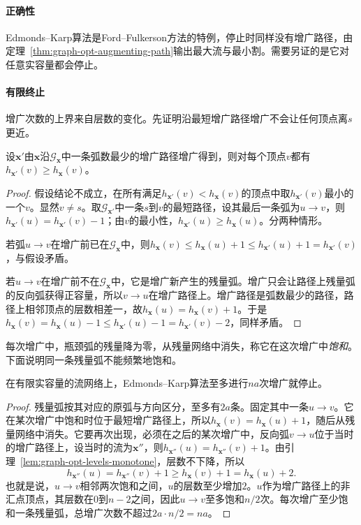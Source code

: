\paragraph{正确性}
Edmonds--Karp算法是Ford--Fulkerson方法的特例，停止时同样没有增广路径，由定理~\ref{thm:graph-opt-augmenting-path}输出最大流与最小割。需要另证的是它对任意实容量都会停止。

\paragraph{有限终止}
增广次数的上界来自层数的变化。先证明沿最短增广路径增广不会让任何顶点离$s$更近。

\begin{lemma}[残量层数单调不减]
\label{lem:graph-opt-levels-monotone}
设$\bm x'$由$\bm x$沿$\mathcal G_{\bm x}$中一条弧数最少的增广路径增广得到，则对每个顶点$v$都有$h_{\bm x'}(v)\geq h_{\bm x}(v)$。
\end{lemma}

\begin{proof}
假设结论不成立，在所有满足$h_{\bm x'}(v)<h_{\bm x}(v)$的顶点中取$h_{\bm x'}(v)$最小的一个$v$。显然$v\neq s$。取$\mathcal G_{\bm x'}$中一条$s$到$v$的最短路径，设其最后一条弧为$u\to v$，则$h_{\bm x'}(u)=h_{\bm x'}(v)-1$；由$v$的最小性，$h_{\bm x'}(u)\geq h_{\bm x}(u)$。分两种情形。

若弧$u\to v$在增广前已在$\mathcal G_{\bm x}$中，则$h_{\bm x}(v)\leq h_{\bm x}(u)+1\leq h_{\bm x'}(u)+1=h_{\bm x'}(v)$，与假设矛盾。

若$u\to v$在增广前不在$\mathcal G_{\bm x}$中，它是增广新产生的残量弧。增广只会让路径上残量弧的反向弧获得正容量，所以$v\to u$在增广路径上。增广路径是弧数最少的路径，路径上相邻顶点的层数相差一，故$h_{\bm x}(u)=h_{\bm x}(v)+1$。于是$h_{\bm x}(v)=h_{\bm x}(u)-1\leq h_{\bm x'}(u)-1=h_{\bm x'}(v)-2$，同样矛盾。
\end{proof}

每次增广中，瓶颈弧的残量降为零，从残量网络中消失，称它在这次增广中\emph{饱和}。下面说明同一条残量弧不能频繁地饱和。

\begin{theorem}
\label{thm:graph-opt-edmonds-karp}
在有限实容量的流网络上，Edmonds--Karp算法至多进行$na$次增广就停止。
\end{theorem}

\begin{proof}
残量弧按其对应的原弧与方向区分，至多有$2a$条。固定其中一条$u\to v$。它在某次增广中饱和时位于最短增广路径上，所以$h_{\bm x}(v)=h_{\bm x}(u)+1$，随后从残量网络中消失。它要再次出现，必须在之后的某次增广中，反向弧$v\to u$位于当时的增广路径上，设当时的流为$\bm x''$，则$h_{\bm x''}(u)=h_{\bm x''}(v)+1$。由引理~\ref{lem:graph-opt-levels-monotone}，层数不下降，所以
\[
  h_{\bm x''}(u)=h_{\bm x''}(v)+1\geq h_{\bm x}(v)+1=h_{\bm x}(u)+2.
\]
也就是说，$u\to v$相邻两次饱和之间，$u$的层数至少增加$2$。$u$作为增广路径上的非汇点顶点，其层数在$0$到$n-2$之间，因此$u\to v$至多饱和$n/2$次。每次增广至少饱和一条残量弧，总增广次数不超过$2a\cdot n/2=na$。
\end{proof}

